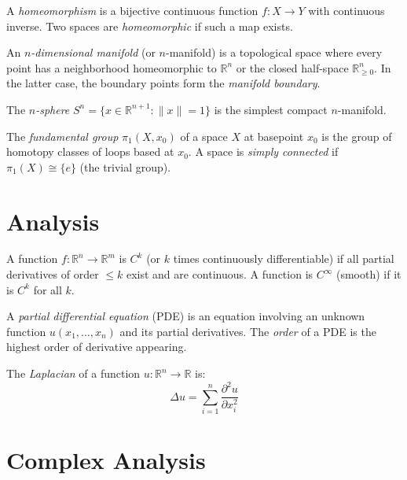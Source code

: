 \begin{definition}
A \textit{homeomorphism} is a bijective continuous function $f: X \to Y$ with continuous inverse. Two spaces are \textit{homeomorphic} if such a map exists.
\end{definition}

\begin{definition}
An \textit{$n$-dimensional manifold} (or $n$-manifold) is a topological space where every point has a neighborhood homeomorphic to $\mathbb{R}^n$ or the closed half-space $\mathbb{R}^n_{\ge 0}$. In the latter case, the boundary points form the \textit{manifold boundary}.
\end{definition}

The \textit{$n$-sphere} $S^n = \{x \in \mathbb{R}^{n+1} : \|x\| = 1\}$ is the simplest compact $n$-manifold.

\begin{definition}
The \textit{fundamental group} $\pi_1(X, x_0)$ of a space $X$ at basepoint $x_0$ is the group of homotopy classes of loops based at $x_0$. A space is \textit{simply connected} if $\pi_1(X) \cong \{e\}$ (the trivial group).
\end{definition}

\section{Analysis}

\begin{definition}
A function $f: \mathbb{R}^n \to \mathbb{R}^m$ is $C^k$ (or $k$ times continuously differentiable) if all partial derivatives of order $\le k$ exist and are continuous. A function is $C^\infty$ (smooth) if it is $C^k$ for all $k$.
\end{definition}

\begin{definition}
A \textit{partial differential equation} (PDE) is an equation involving an unknown function $u(x_1, \ldots, x_n)$ and its partial derivatives. The \textit{order} of a PDE is the highest order of derivative appearing.
\end{definition}

\begin{definition}
The \textit{Laplacian} of a function $u: \mathbb{R}^n \to \mathbb{R}$ is:
\[
\Delta u = \sum_{i=1}^n \frac{\partial^2 u}{\partial x_i^2}
\]
\end{definition}

\section{Complex Analysis}

